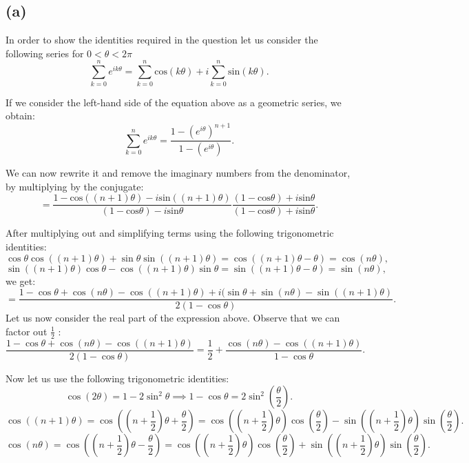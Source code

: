 \documentclass[12pt]{article}
\begin{document}
\subsection*{(a)}
In order to show the identities required in the question let us consider the following series for $0 < \theta < 2\pi$
\begin{equation}
	 \sum^{n}_{k = 0} e^{ik\theta} = \sum^{n}_{k = 0} \text{cos}(k\theta) + i\sum^{n}_{k = 0} \text{sin}(k\theta)
 .\end{equation}

If we consider the left-hand side of the equation above as a geometric series, we obtain:
\[
	\sum^{n}_{k = 0} e^{ik\theta} = \frac{1 - (e^{i\theta})^{n+1}}{1 - (e^{i\theta})}
.\]

We can now rewrite it and remove the imaginary numbers from the denominator, by multiplying by the conjugate:
\[
	= \frac{1 - \text{cos}((n+1)\theta) - i\text{sin}((n+1)\theta)}{(1 - \text{cos}\theta) - i\text{sin}\theta}
	\frac{(1 - \text{cos}\theta) + i\text{sin}\theta}{(1 - \text{cos}\theta) + i\text{sin}\theta}
.\]

After multiplying out and simplifying terms using the following trigonometric identities:
\[
	\cos\theta\cos((n+1)\theta) + \sin\theta\sin((n+1)\theta) = \cos((n+1)\theta - \theta) = \cos(n\theta)
,\]
\[
	\sin((n+1)\theta)\cos\theta - \cos((n+1)\theta)\sin\theta   = \sin((n+1)\theta - \theta) = \sin(n\theta)
,\]
we get:
\begin{equation}
	= \frac{1 - \cos\theta + \cos(n\theta) - \cos((n+1)\theta)  + i(\sin\theta + \sin(n\theta) - \sin((n+1)\theta)}{2(1 - \cos\theta)}
.\end{equation}
Let us now consider the real part of the expression above. Observe that we can factor out $\frac{1}{2}$ :
\begin{equation}
	\frac{1 - \cos\theta + \cos(n\theta) - \cos((n+1)\theta)}{2(1 - \cos\theta)} = \frac{1}{2} + \frac{\cos(n\theta) - \cos((n+1)\theta)}{1 - \cos\theta}
.\end{equation}

Now let us use the following trigonometric identities:
\[
	\cos(2\theta) = 1 - 2\sin^2\theta \implies 1 - \cos\theta = 2 \sin^2\left(\frac{\theta}{2}\right)
.\]
\[
	\cos((n+1)\theta) = \cos(\left(n+\frac{1}{2}\right)\theta + \frac{\theta}{2}) =
	\cos(\left(n+\frac{1}{2}\right)\theta) \cos(\frac{\theta}{2}) - \sin(\left(n+\frac{1}{2}\right)\theta) \sin(\frac{\theta}{2})
.\]
\[
	\cos(n\theta) = \cos(\left(n+\frac{1}{2}\right)\theta - \frac{\theta}{2}) =
	\cos(\left(n+\frac{1}{2}\right)\theta) \cos(\frac{\theta}{2}) + \sin(\left(n+\frac{1}{2}\right)\theta) \sin(\frac{\theta}{2})
.\]
\end{document}
